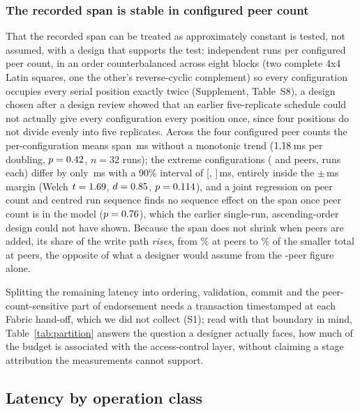 \documentclass[a4paper,fleqn]{cas-dc}
\begin{document}


\subsubsection{The recorded span is stable in configured peer count}
\label{subsubsec:acinvariance}

That the recorded span can be treated as approximately constant is tested,
not assumed, with a design that supports the test: \PartRunsPerConfig{}
independent runs per configured peer count, in an order counterbalanced
across eight blocks (two complete 4x4 Latin squares, one the other's
reverse-cyclic complement) so every configuration occupies every serial
position exactly twice (Supplement, Table~S8), a design chosen after a
  design review showed that an earlier five-replicate schedule could not
actually give every configuration every position once, since four
positions do not divide evenly into five replicates. Across the four
configured peer counts the per-configuration means span \PartSpread\,ms
without a monotonic trend ($1.18$\,ms per doubling,
$p=0.42$, $n=32$ runs); the extreme configurations (\ScaleMinPeers{}
and \ScaleMaxPeers{} peers, \PartRunsPerConfig{} runs each) differ by only
\PartTostDiff\,ms with a 90\% interval of [\PartTostLow,
\PartTostHigh]\,ms, entirely inside the $\pm$\DecisionMargin\,ms margin
(Welch $t=1.69$, $d=0.85$, $p=0.114$), and a
joint regression on peer count and centred run sequence finds no sequence
effect on the span once peer count is in the model
($p=0.76$), which the earlier single-run, ascending-order
design could not have shown. Because the span does not shrink when peers
are added, its share of the write path \emph{rises}, from
\PartAccessPct\% at \ScaleMinPeers{} peers to \PartAccessPctAtMax\% of the
smaller total at \ScaleMaxPeers{} peers, the opposite of what a designer
would assume from the \ScaleMinPeers-peer figure alone.

Splitting the remaining latency into ordering, validation, commit and the
peer-count-sensitive part of endorsement needs a transaction timestamped at
each Fabric hand-off, which we did not collect (S1); read with that
boundary in mind, Table~\ref{tab:partition} answers the question a designer
actually faces, how much of the budget is associated with the
access-control layer, without claiming a stage attribution the
measurements cannot support.

\subsection{Latency by operation class}
\label{subsec:byclass}
\end{document}
